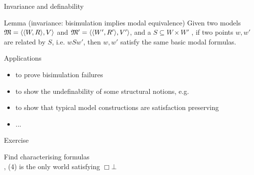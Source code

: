 \documentclass{beamer}
\begin{document}
\begin{slide}{Invariance and definability}\label{s:31}
\small
\begin{block}{Lemma (invariance: bisimulation implies modal equivalence)}
Given two models $\mathfrak{M} = \mathopen{\langle}\mathopen{\langle}W, R\mathclose{\rangle}, V\mathclose{\rangle}$ and $\mathfrak{M}' = \mathopen{\langle}\mathopen{\langle}W', R'\mathclose{\rangle}, V'\mathclose{\rangle}$, and a  
$S \subseteq W \times W'$ , if two points $w, w'$ are related by $S$, i.e. $w S w'$, then $w, w'$  satisfy the same basic modal formulas.
 \end{block}
\begin{block}{Applications}
\begin{itemize}
\item to prove bisimulation failures
\item to show the undefinability of some structural notions, e.g. 
\item  to show that typical model constructions are satisfaction preserving
\item ...
\end{itemize}
\end{block}
\end{slide}


\begin{frame}{Exercise}
\begin{exampleblock}{Find characterising formulas}
\centering
{}
~~~~~~~~~~~
\\[4mm]
\eg, (4) is the only world satisfying $\Box\bot$
\end{exampleblock}
\end{frame}
\end{document}

